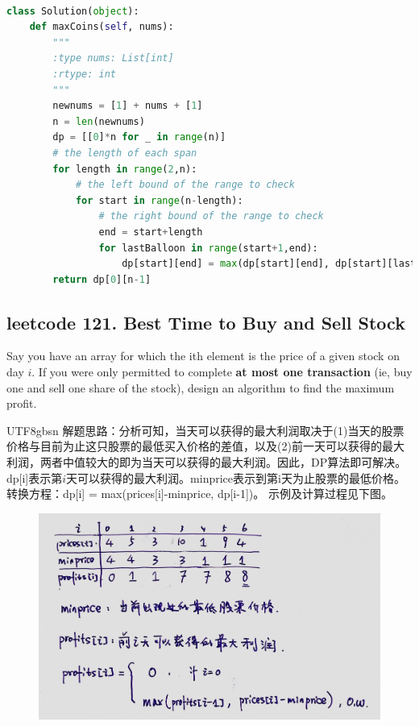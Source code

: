 \documentclass[a4paper,10pt]{article}
\begin{document}
\begin{lstlisting}[language=Python, caption=Problem312. Burst Balloons]

class Solution(object):
    def maxCoins(self, nums):
        """
        :type nums: List[int]
        :rtype: int
        """
        newnums = [1] + nums + [1]
        n = len(newnums)
        dp = [[0]*n for _ in range(n)]
        # the length of each span
        for length in range(2,n): 
            # the left bound of the range to check
            for start in range(n-length): 
                # the right bound of the range to check
                end = start+length 
                for lastBalloon in range(start+1,end):
                    dp[start][end] = max(dp[start][end], dp[start][lastBalloon]+newnums[start]*newnums[lastBalloon]*newnums[end]+dp[lastBalloon][end])
        return dp[0][n-1]
\end{lstlisting}





\subsection{leetcode 121. Best Time to Buy and Sell Stock}
Say you have an array for which the ith element is the price of a given stock on day $i$. If you were only permitted to complete \textbf{at most one transaction} (ie, buy one and sell one share of the stock), design an algorithm to find the maximum profit. \\

\begin{CJK*}{UTF8}{gbsn}
\noindent 解题思路：分析可知，当天可以获得的最大利润取决于(1)当天的股票价格与目前为止这只股票的最低买入价格的差值，以及(2)前一天可以获得的最大利润，两者中值较大的即为当天可以获得的最大利润。因此，DP算法即可解决。dp[i]表示第$i$天可以获得的最大利润。minprice表示到第i天为止股票的最低价格。 转换方程：dp[i] = max(prices[i]-minprice, dp[i-1])。 示例及计算过程见下图。
\end{CJK*}

\begin{figure}[h]
    \includegraphics[width=\textwidth]{leetcode121.jpg}
    \centering\\
\end{figure}
\end{document}
